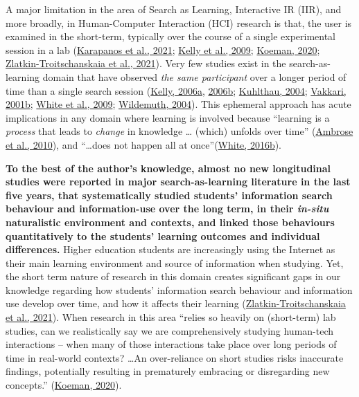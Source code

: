 \documentclass[a4paper, nobind]{templates/ociamthesis}
\begin{document}
A major limitation in the area of Search as Learning, Interactive IR
(IIR), and more broadly, in Human-Computer Interaction (HCI) research is
that, the user is examined in the short-term, typically over the course
of a single experimental session in a lab
(\protect\hyperlink{ref-karapanos2021advances}{Karapanos et al., 2021}; \protect\hyperlink{ref-kelly2009evaluation}{Kelly et al., 2009}; \protect\hyperlink{ref-HCIUXres81_online}{Koeman, 2020}; \protect\hyperlink{ref-zlatkin2021students}{Zlatkin-Troitschanskaia et al., 2021}).
Very few studies exist in the search-as-learning domain that have
observed \emph{the same participant} over a longer period of time than a
single search session
(\protect\hyperlink{ref-kelly2006measuring_a}{Kelly, 2006a}, \protect\hyperlink{ref-kelly2006measuring_b}{2006b}; \protect\hyperlink{ref-kuhlthau2004seeking}{Kuhlthau, 2004}; \protect\hyperlink{ref-vakkari2001changes}{Vakkari, 2001b}; \protect\hyperlink{ref-white2009characterizing}{White et al., 2009}; \protect\hyperlink{ref-wildemuth2004effects}{Wildemuth, 2004}).
This ephemeral approach has acute implications in any domain where
learning is involved because ``learning is a \emph{process} that leads to
\emph{change} in knowledge \ldots{} (which) unfolds over time'' (\protect\hyperlink{ref-ambrose2010howa}{Ambrose et al., 2010}),
and ``\ldots does not happen all at once''(\protect\hyperlink{ref-white_2016_iwss_learning}{White, 2016b}).

\textbf{To the best of the author's knowledge, almost no new longitudinal
studies were reported in major search-as-learning literature in the last
five years, that systematically studied students' information search
behaviour and information-use over the long term, in their \emph{in-situ}
naturalistic environment and contexts, and linked those behaviours
quantitatively to the students' learning outcomes and individual
differences.} Higher education students are increasingly using the
Internet as their main learning environment and source of information
when studying. Yet, the short term nature of research in this domain
creates significant gaps in our knowledge regarding how students'
information search behaviour and information use develop over time, and
how it affects their learning (\protect\hyperlink{ref-zlatkin2021students}{Zlatkin-Troitschanskaia et al., 2021}). When research in
this area ``relies so heavily on (short-term) lab studies, can we
realistically say we are comprehensively studying human-tech
interactions -- when many of those interactions take place over long
periods of time in real-world contexts? \ldots An over-reliance on short
studies risks inaccurate findings, potentially resulting in prematurely
embracing or disregarding new concepts.'' (\protect\hyperlink{ref-HCIUXres81_online}{Koeman, 2020}).
\end{document}
